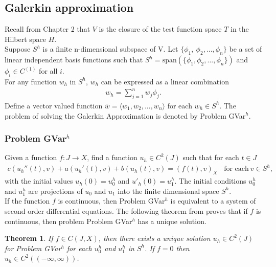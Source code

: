 \documentclass[../../main.tex]{subfiles}
\begin{document}
\subsection{Galerkin approximation}
Recall from Chapter 2 that $V$ is the closure of the test function space $T$ in the Hilbert space $H$.\\

Suppose $S^h$ is a finite n-dimensional subspace of V. Let $\{\phi_1, \ \phi_2,...,\phi_n\}$ be a set of linear independent basis functions such that $S^h = \textrm{span}(\{\phi_1, \phi_2, ..., \phi_n \})$ and $\phi_i \in C^{(1)}$ for all $i$.\\

For any function $w_h$ in $S^h$, $w_h$ can be expressed as a linear combination
\begin{eqnarray*}
	w_h = \sum_{j=1}^n w_j \phi_j.
\end{eqnarray*} Define a vector valued function $\bar{w} = \langle w_1,w_2,...,w_n \rangle$ for each $w_h \in S^h$. The problem of solving the Galerkin Approximation is denoted by Problem GVar$^h$.

\subsubsection*{Problem GVar$^h$}
Given a function $f: J \rightarrow X$, find a function $u_h \in C^2(J)$ such that for each $t\in J$
\begin{eqnarray}
	c(u_h''(t),v)+a(u_h'(t),v)+b(u_h(t),v)= (f(t),v)_{X} \ \ \ \ \textrm{for each} \ v \in S^h, \label{DC_E2}
\end{eqnarray}
with the initial values $u_h(0)=u^h_{0}$ and $u'_h(0)=u^h_{1}$. The initial conditions $u^h_{0}$ and $u^h_{1}$ are projections of $u_0$ and $u_1$ into the finite dimensional space $S^h$.\\

If the function $f$ is continuous, then Problem GVar$^h$ is equivalent to a system of second order differential equations. The following theorem from \cite{BV13} proves that if $f$ is continuous, then problem Problem GVar$^h$ has a unique solution.

\newtheorem{DC_Thm2}{Theorem}
\begin{DC_Thm2} \label{DC_THM2}
	If $f \in C(J,X)$, then there exists a unique solution $u_h \in C^2(J)$ for Problem GVar$^h$ for each $u_0^h$ and $u_1^h$ in $S^h$. If $f = 0$ then $u_h \in C^2((-\infty, \infty))$.
\end{DC_Thm2}
\end{document}
